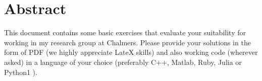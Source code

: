 \showchapterboxfalse
\chapter{Abstract}
This document contains some basic exercises that evaluate your suitability for working in my research
group at Chalmers. Please provide your solutions in the form of PDF (we highly appreciate LateX skills)
and also working code (wherever asked) in a language of your choice (preferably C++, Matlab, Ruby,
Julia or Python1
).